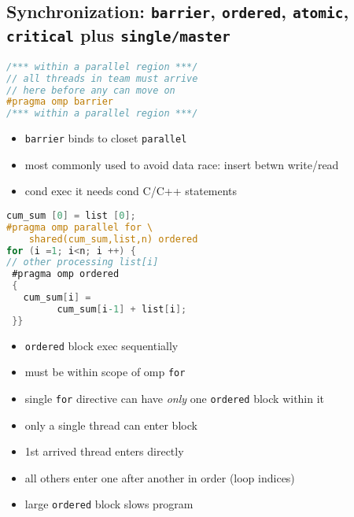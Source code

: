 \subsection*{Synchronization: \texttt{barrier}, \texttt{ordered}, \texttt{atomic}, \texttt{critical} plus \texttt{single/master}}
\begin{minipage}{0.5\linewidth}
\begin{lstlisting}[language=C]
/*** within a parallel region ***/
// all threads in team must arrive
// here before any can move on
#pragma omp barrier
/*** within a parallel region ***/
\end{lstlisting}
\end{minipage}
\begin{minipage}{0.5\linewidth}
  \begin{itemize}
  \item \texttt{barrier} binds to closet \texttt{parallel}
  \item most commonly used to avoid data race: insert betwn write/read
  \item cond exec it needs cond C/C++ statements
\end{itemize}
\end{minipage}
\begin{minipage}{0.5\linewidth}
\begin{lstlisting}[language=C]
cum_sum [0] = list [0];
#pragma omp parallel for \
    shared(cum_sum,list,n) ordered
for (i =1; i<n; i ++) {
// other processing list[i]
 #pragma omp ordered
 {
   cum_sum[i] =
         cum_sum[i-1] + list[i];
 }}
\end{lstlisting}
\end{minipage}
\begin{minipage}{0.5\linewidth}
  \begin{itemize}
  \item \texttt{ordered} block exec sequentially
  \item must be within scope of omp \texttt{for}
  \item single \texttt{for} directive can have \emph{only} one \texttt{ordered} block within it
  \item only a single thread can enter block
  \item 1st arrived thread enters directly
  \item all others enter one after another in order (loop indices)
  \item large \texttt{ordered} block slows program
\end{itemize}
\end{minipage}

